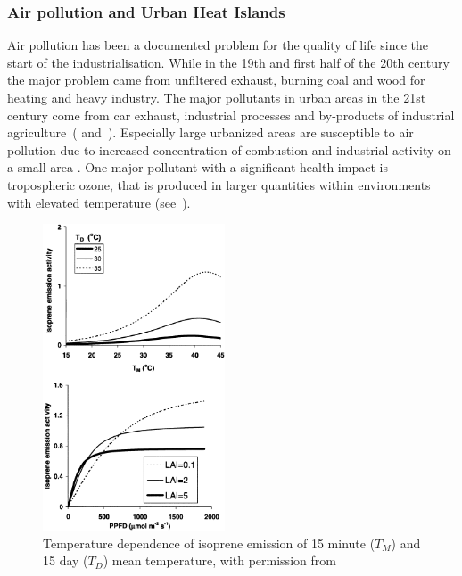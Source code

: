 \documentclass[12pt,a4paper, english,twoside]{scrartcl}
\begin{document}
    \subsubsection{Air pollution and Urban Heat Islands}\label{ssec:airpollution}
      Air pollution has been a documented problem for the quality of life since the start of the industrialisation. 
      While in the 19th and first half of the 20th century the major problem came from unfiltered exhaust, burning coal and wood for heating and heavy industry.
      The major pollutants in urban areas in the 21st century come from car exhaust, industrial processes and by-products of industrial agriculture~(\cite{Leung2015} and~\cite{McDuffie2021}).
      Especially large urbanized areas are susceptible to air pollution due to increased concentration of combustion and industrial activity on a small area \autocite{Kanakidou2011}.
      One major pollutant with a significant health impact is tropospheric ozone, that is produced in larger quantities within environments with elevated temperature (see~\cite{Ebi2008}). \\
      \begin{figure}
        \vspace{-1cm}
         \begin{center}
         \includegraphics[width=0.48\textwidth]{img/VOCsGraphs}
       \end{center}
       \caption{Temperature dependence of isoprene emission of 15 minute ($T_M$) and 15 day ($T_D$) mean temperature, with permission from~\cite{Guenther2000}}\label{fig:tempVOC}
      \end{figure}
\end{document}
